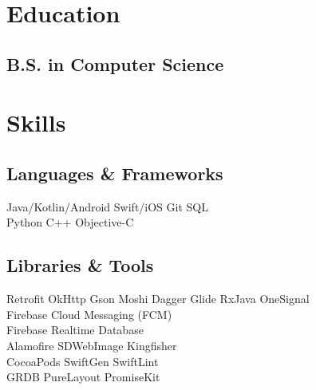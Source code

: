 \documentclass[]{Resume}
\begin{document}
%
%
\lastupdated

%
%

%
%

\begin{minipage}[t]{0.33\textwidth} 


\section{Education} 

\subsection{B.S. in Computer Science}
\sectionsep

\section{Skills}
\subsection{Languages \& Frameworks}
Java/Kotlin/Android \textbullet{} Swift/iOS
Git \textbullet{} SQL \\
Python \textbullet{} C++ \textbullet{} Objective-C
\sectionsep

\subsection{Libraries \& Tools}
Retrofit \textbullet{} OkHttp \textbullet{} Gson \textbullet{} Moshi  \textbullet{} 
Dagger \textbullet{} Glide \textbullet{} RxJava \textbullet{} OneSignal\\
\vspace{\topsep}
Firebase Cloud Messaging (FCM) \textbullet{}\\
Firebase Realtime Database \textbullet{}\\
Alamofire \textbullet{} SDWebImage \textbullet{} Kingfisher\\ 
CocoaPods \textbullet{} SwiftGen \textbullet{} SwiftLint \textbullet{}\\
GRDB  \textbullet{} PureLayout \textbullet{} PromiseKit
\sectionsep


\end{minipage}
\end{document}
